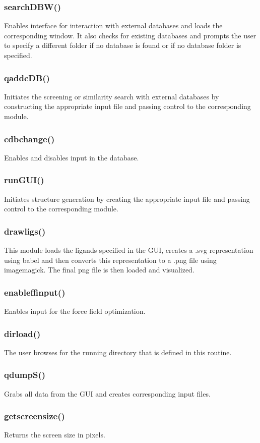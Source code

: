 \documentclass[a4paper,12pt]{assignment}
\begin{document}
\subsubsection{searchDBW()}
Enables interface for interaction with external databases and loads the corresponding window. It also checks for existing databases and prompts the user to specify a different folder if no database is found or if no database folder is specified.
\subsubsection{qaddcDB()}
Initiates the screening or similarity search with external databases by constructing the appropriate input file and passing control to the corresponding module.
\subsubsection{cdbchange()}
Enables and disables input in the database.
\subsubsection{runGUI()}
Initiates structure generation by creating the appropriate input file and passing control to the corresponding module.
\subsubsection{drawligs()}
This module loads the ligands specified in the GUI, creates a .svg representation using babel and then converts this representation to a .png file using imagemagick. The final png file is then loaded and visualized.
\subsubsection{enableffinput()}
Enables input for the force field optimization.
\subsubsection{dirload()}
The user browses for the running directory that is defined in this routine.
\subsubsection{qdumpS()}
Grabs all data from the GUI and creates corresponding input files.
\subsubsection{getscreensize()}
Returns the screen size in pixels.
\end{document}
